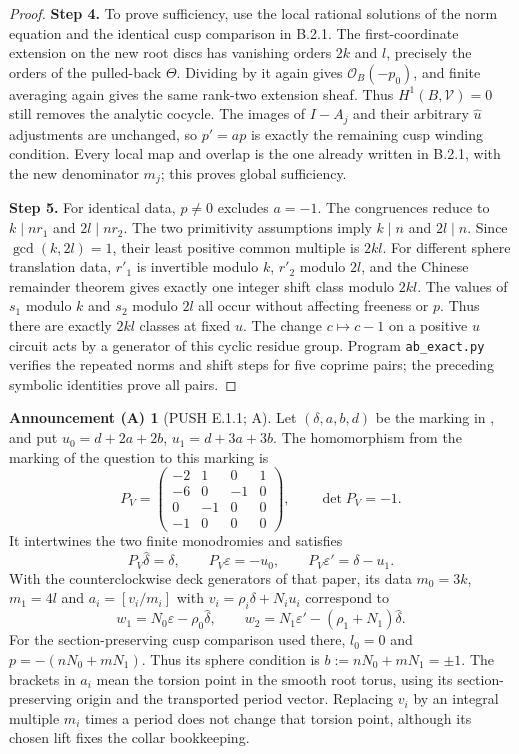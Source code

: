 \documentclass[11pt,a4paper]{article}
\theoremstyle{plain}
\theoremstyle{definition}
\newtheorem{announcement}[theorem]{Announcement (A)}
\begin{document}
\begin{proof}
\par\smallskip\noindent\textbf{Step 4.} To prove sufficiency, use the local rational solutions of the norm equation and the identical cusp comparison in B.2.1. The first-coordinate extension on the new root discs has vanishing orders $2k$ and $l$, precisely the orders of the pulled-back $\Theta$. Dividing by it again gives $\mathcal O_B(-p_0)$, and finite averaging again gives the same rank-two extension sheaf. Thus $H^1(B,\mathcal V)=0$ still removes the analytic cocycle. The images of $I-A_j$ and their arbitrary $\widehat u$ adjustments are unchanged, so $p'=ap$ is exactly the remaining cusp winding condition. Every local map and overlap is the one already written in B.2.1, with the new denominator $m_j$; this proves global sufficiency.

\par\smallskip\noindent\textbf{Step 5.} For identical data, $p\ne0$ excludes $a=-1$. The congruences reduce to $k\mid nr_1$ and $2l\mid nr_2$. The two primitivity assumptions imply $k\mid n$ and $2l\mid n$. Since $\gcd(k,2l)=1$, their least positive common multiple is $2kl$. For different sphere translation data, $r'_1$ is invertible modulo $k$, $r'_2$ modulo $2l$, and the Chinese remainder theorem gives exactly one integer shift class modulo $2kl$. The values of $s_1$ modulo $k$ and $s_2$ modulo $2l$ all occur without affecting freeness or $p$. Thus there are exactly $2kl$ classes at fixed $u$. The change $c\mapsto c-1$ on a positive $u$ circuit acts by a generator of this cyclic residue group. Program \texttt{ab\_exact.py} verifies the repeated norms and shift steps for five coprime pairs; the preceding symbolic identities prove all pairs.
\end{proof}
\begin{announcement}[PUSH E.1.1; A]\label{push:E.1.1}
Let $(\delta,a,b,d)$ be the marking in
\cite[Section 2, equations (2.1), (2.2), (2.7), (2.11)--(2.12)]{VL26},
and put $u_0=d+2a+2b$, $u_1=d+3a+3b$.
The homomorphism from the marking of the question to this marking is
\[
 P_V=\begin{pmatrix}
 -2&1&0&1\\-6&0&-1&0\\0&-1&0&0\\-1&0&0&0
 \end{pmatrix},\qquad \det P_V=-1.
\]
It intertwines the two finite monodromies and satisfies
\[
 P_V\widehat\delta=\delta,\qquad
 P_V\varepsilon=-u_0,\qquad
 P_V\varepsilon'=\delta-u_1.
\]
With the counterclockwise deck generators of that paper, its data
$m_0=3k$, $m_1=4l$ and
$a_i=[v_i/m_i]$ with $v_i=\rho_i\delta+N_i u_i$ correspond to
\[
 w_1=N_0\varepsilon-\rho_0\widehat\delta,
 \qquad
 w_2=N_1\varepsilon'-(\rho_1+N_1)\widehat\delta.
\]
For the section-preserving cusp comparison used there, $l_0=0$ and
$p=-(nN_0+mN_1)$.  Thus its sphere condition is
$b:=nN_0+mN_1=\pm1$.
The brackets in $a_i$ mean the torsion point in the smooth
root torus, using its section-preserving origin and the
transported period vector.  Replacing $v_i$ by an integral
multiple $m_i$ times a period does not change that torsion
point, although its chosen lift fixes the collar bookkeeping.
\end{announcement}
\end{document}
